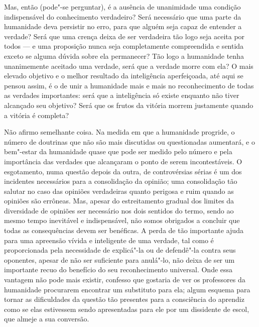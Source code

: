 Mas, então (pode"-se perguntar), é a ausência de unanimidade uma
condição indispensável do conhecimento verdadeiro? Será necessário que
uma parte da humanidade deva persistir no erro, para que alguém seja
capaz de entender a verdade? Será que uma crença deixa de ser
verdadeira tão logo seja aceita por todos --- e uma proposição nunca seja
completamente compreendida e sentida exceto se alguma dúvida sobre ela
permanecer? Tão logo a humanidade tenha unanimemente aceitado uma
verdade, será que a verdade morre com ela? O mais elevado objetivo e o
melhor resultado da inteligência aperfeiçoada, até aqui se pensou
assim, é o de unir a humanidade mais e mais no reconhecimento de todas
as verdades importantes: será que a inteligência só existe enquanto não
tiver alcançado seu objetivo? Será que os frutos da vitória morrem
justamente quando a vitória é completa?

Não afirmo semelhante coisa. Na medida em que a humanidade progride, o
número de doutrinas que não são mais discutidas ou questionadas aumentará,
e o bem"-estar da humanidade quase que pode ser medido pelo número e
pela importância das verdades que alcançaram o ponto de serem
incontestáveis. O esgotamento, numa questão depois da outra, de
controvérsias sérias é um dos incidentes necessários para a consolidação da
opinião; uma consolidação tão salutar no caso das opiniões verdadeiras
quanto perigosa e ruim quando as opiniões são errôneas. Mas, apesar do
estreitamento gradual dos limites da diversidade de opiniões ser
necessário nos dois sentidos do termo, sendo ao mesmo tempo
inevitável e indispensável, não somos obrigados a concluir que todas as
consequências devem ser benéficas. A perda de tão importante ajuda para
uma apreensão vívida e inteligente de uma verdade, tal como é
proporcionada pela necessidade de explicá"-la ou de defendê"-la
contra seus oponentes, apesar de não ser suficiente para anulá"-lo, não
deixa de ser um importante recuo do benefício do seu reconhecimento
universal. Onde essa vantagem não pode mais existir, confesso que
gostaria de ver os professores da humanidade procurarem encontrar um
substituto para ela; algum esquema para tornar as dificuldades da
questão tão presentes para a consciência do aprendiz como se elas
estivessem sendo apresentadas para ele por um dissidente de escol, que
almeje a sua conversão. 

